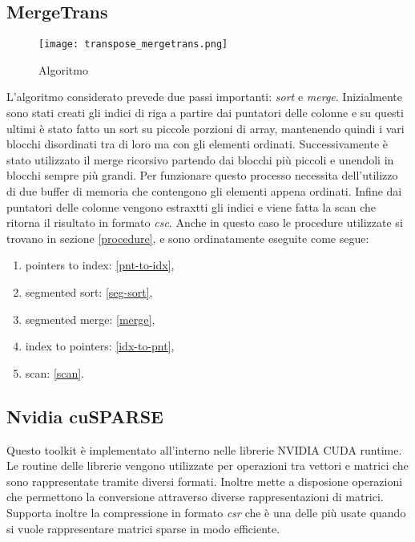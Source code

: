 \subsection{MergeTrans}

\begin{figure}[htbp]
    \centering
	\texttt{[image: transpose\_mergetrans.png]}
	\caption{Algoritmo \MergeTrans}
	\label{transpose_algo_scantrans}
\end{figure}
	
L'algoritmo considerato prevede due passi importanti: \textit{sort} e \textit{merge}.
Inizialmente sono stati creati gli indici di riga a partire dai puntatori delle colonne e su questi ultimi è stato fatto un sort su piccole porzioni di array, mantenendo quindi i vari blocchi disordinati tra di loro ma con gli elementi ordinati. Successivamente è stato utilizzato il merge ricorsivo partendo dai blocchi più piccoli e unendoli in blocchi sempre più grandi. Per funzionare questo processo necessita dell'utilizzo di due buffer di memoria che contengono gli elementi appena ordinati. Infine dai puntatori delle colonne vengono estraxtti gli indici e viene fatta la scan che ritorna il risultato in formato \textit{csc}. \newline
Anche in questo caso le procedure utilizzate si trovano in sezione \ref{procedure}, e sono ordinatamente eseguite come segue:
\begin{enumerate}
	\item pointers to index: \ref{pnt-to-idx},
	\item segmented sort: \ref{seg-sort},
	\item segmented merge: \ref{merge},
	\item index to pointers: \ref{idx-to-pnt},
	\item scan: \ref{scan}.
\end{enumerate}



\subsection{Nvidia cuSPARSE}

Questo toolkit è implementato all'interno nelle librerie NVIDIA CUDA runtime. Le routine delle librerie vengono utilizzate per operazioni tra vettori e matrici che sono rappresentate tramite diversi formati. Inoltre mette a disposione operazioni che permettono la conversione attraverso diverse rappresentazioni di matrici. Supporta inoltre la compressione in formato \textit{csr} che è una delle più usate quando si vuole rappresentare matrici sparse in modo efficiente.


